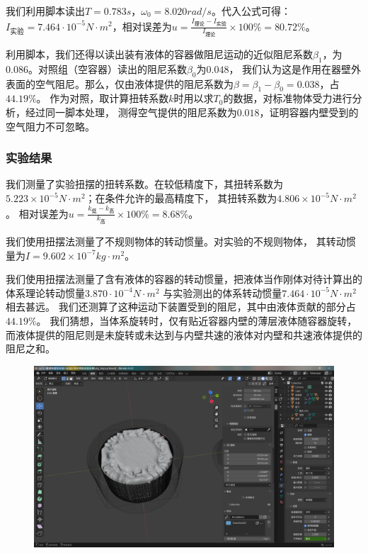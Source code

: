 \documentclass[12pt,hyperref,a4paper,UTF8]{ctexart}
\begin{document}
我们利用脚本读出$T = 0.783s$，$\omega_0 = 8.020rad/s$。代入公式可得：
$ I_{实验} = 7.464·10^{-5} N·m^2 $，相对误差为$ u = \frac{I_{理论} - I_{实验}}{I_{理论}} \times 100\% = 80.72\% $。

利用脚本，我们还得以读出装有液体的容器做阻尼运动的近似阻尼系数$\beta_1$，为$0.086$。对照组（空容器）读出的阻尼系数$\beta_0$为$0.048$，
我们认为这是作用在器壁外表面的空气阻尼。那么，仅由液体提供的阻尼系数为$ \beta = \beta_1 - \beta_0 = 0.038 $，占$44.19\%$。
作为对照，取计算扭转系数$k$时用以求$T_0$的数据，对标准物体受力进行分析，经过同一脚本处理，
测得空气提供的阻尼系数为$0.018$，证明容器内壁受到的空气阻力不可忽略。

\subsubsection{实验结果}

我们测量了实验扭摆的扭转系数。在较低精度下，其扭转系数为$5.223 \times 10^{-5} N·m^2$；在条件允许的最高精度下，
其扭转系数为$4.806 \times 10^{-5} N·m^2$。
相对误差为$ u = \frac{k_{低} - k_{高}}{k_{高}} \times 100\% = 8.68\% $。

我们使用扭摆法测量了不规则物体的转动惯量。对实验的不规则物体，
其转动惯量为$ I = 9.602 \times 10^{-7} kg·m^2 $。

我们使用扭摆法测量了含有液体的容器的转动惯量，把液体当作刚体对待计算出的体系理论转动惯量$3.870·10^{-4} N·m^2$
与实验测出的体系转动惯量$7.464·10^{-5} N·m^2$相去甚远。
我们还测算了这种运动下装置受到的阻尼，其中由液体贡献的部分占$44.19\%$。
我们猜想，当体系旋转时，仅有贴近容器内壁的薄层液体随容器旋转，
而液体提供的阻尼则是未旋转或未达到与内壁共速的液体对内壁和共速液体提供的阻尼之和。

\begin{figure}[htbp]
    \centering
    \includegraphics{blender.eps}
    \caption{}
\end{figure}
\end{document}
